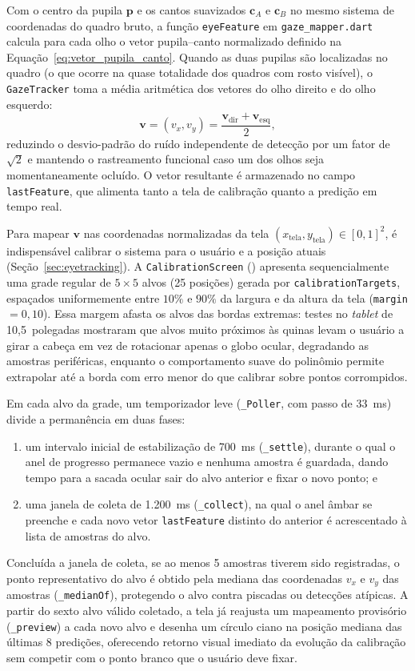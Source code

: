 Com o centro da pupila $\mathbf{p}$ e os cantos suavizados $\mathbf{c}_A$ e $\mathbf{c}_B$ no mesmo sistema de coordenadas do quadro bruto, a função \texttt{eyeFeature} em \texttt{gaze\_mapper.dart} calcula para cada olho o vetor pupila--canto normalizado definido na Equação~\ref{eq:vetor_pupila_canto}. Quando as duas pupilas são localizadas no quadro (o que ocorre na quase totalidade dos quadros com rosto visível), o \texttt{GazeTracker} toma a média aritmética dos vetores do olho direito e do olho esquerdo:
\begin{equation}
    \mathbf{v} = (v_x, v_y) = \frac{\mathbf{v}_{\text{dir}} + \mathbf{v}_{\text{esq}}}{2},
    \label{eq:vetor_medio}
\end{equation}
reduzindo o desvio-padrão do ruído independente de detecção por um fator de $\sqrt{2}$ e mantendo o rastreamento funcional caso um dos olhos seja momentaneamente ocluído. O vetor resultante é armazenado no campo \texttt{lastFeature}, que alimenta tanto a tela de calibração quanto a predição em tempo real.

Para mapear $\mathbf{v}$ nas coordenadas normalizadas da tela $(x_{\text{tela}}, y_{\text{tela}}) \in [0, 1]^2$, é indispensável calibrar o sistema para o usuário e a posição atuais (Seção~\ref{sec:eyetracking}). A \texttt{Calibration\allowbreak Screen} () apresenta sequencialmente uma grade regular de $5 \times 5$ alvos (25 posições) gerada por \texttt{calibrationTargets}, espaçados uniformemente entre $10\%$ e $90\%$ da largura e da altura da tela (\texttt{margin} $= 0{,}10$). Essa margem afasta os alvos das bordas extremas: testes no \textit{tablet} de 10,5~polegadas mostraram que alvos muito próximos às quinas levam o usuário a girar a cabeça em vez de rotacionar apenas o globo ocular, degradando as amostras periféricas, enquanto o comportamento suave do polinômio permite extrapolar até a borda com erro menor do que calibrar sobre pontos corrompidos.

Em cada alvo da grade, um temporizador leve (\texttt{\_Poller}, com passo de 33~ms) divide a permanência em duas fases:
\begin{enumerate}
    \item um intervalo inicial de estabilização de 700~ms (\texttt{\_settle}), durante o qual o anel de progresso permanece vazio e nenhuma amostra é guardada, dando tempo para a sacada ocular sair do alvo anterior e fixar o novo ponto; e
    \item uma janela de coleta de 1.200~ms (\texttt{\_collect}), na qual o anel âmbar se preenche e cada novo vetor \texttt{lastFeature} distinto do anterior é acrescentado à lista de amostras do alvo.
\end{enumerate}
Concluída a janela de coleta, se ao menos 5 amostras tiverem sido registradas, o ponto representativo do alvo é obtido pela mediana das coordenadas $v_x$ e $v_y$ das amostras (\texttt{\_medianOf}), protegendo o alvo contra piscadas ou detecções atípicas. A partir do sexto alvo válido coletado, a tela já reajusta um mapeamento provisório (\texttt{\_preview}) a cada novo alvo e desenha um círculo ciano na posição mediana das últimas 8 predições, oferecendo retorno visual imediato da evolução da calibração sem competir com o ponto branco que o usuário deve fixar.

